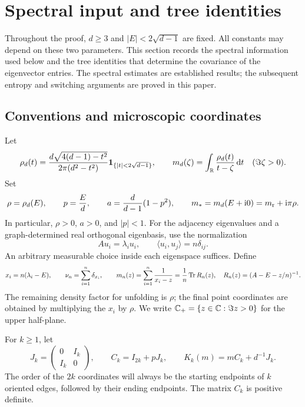 \section{Spectral input and tree identities}\label{sec:preliminaries}

Throughout the proof, \(d\ge3\) and \(|E|<2\sqrt{d-1}\) are fixed.
All constants may depend on these two parameters.
This section records the spectral information used below and the tree
identities that determine the covariance of the eigenvector entries.
The spectral estimates are established results; the subsequent entropy
and switching arguments are proved in this paper.

\subsection{Conventions and microscopic coordinates}

Let
\[
 \rho_d(t)=
 \frac{d\sqrt{4(d-1)-t^2}}{2\pi(d^2-t^2)}
 \mathbf 1_{\{|t|<2\sqrt{d-1}\}},
 \qquad
 m_d(\zeta)=\int_{\mathbb R}\frac{\rho_d(t)}{t-\zeta}\,\mathrm d t
 \quad(\Im\zeta>0).
\]
Set
\[
 \rho=\rho_d(E),\qquad p=\frac Ed,\qquad
 a=\frac{d}{d-1}(1-p^2),\qquad
 m_*=m_d(E+\mathrm i0)=m_{\rm r}+\mathrm i\pi\rho.
\]
In particular, \(\rho>0\), \(a>0\), and \(|p|<1\).
For the adjacency eigenvalues and a graph-determined real orthogonal
eigenbasis, use the normalization
\[
 Au_i=\lambda_i u_i,\qquad
 \langle u_i,u_j\rangle=n\delta_{ij}.
\]
An arbitrary measurable choice inside each eigenspace suffices.
Define
\begin{equation}\label{eq:micro-coordinates}
 x_i=n(\lambda_i-E),\qquad
 \nu_n=\sum_{i=1}^n\delta_{x_i},\qquad
 m_n(z)=\sum_{i=1}^n\frac1{x_i-z}
       =\frac1n\operatorname{Tr} R_n(z),
 \quad
 R_n(z)=(A-E-z/n)^{-1}.
\end{equation}
The remaining density factor for unfolding is \(\rho\); the final
point coordinates are obtained by multiplying the \(x_i\) by \(\rho\).
We write \(\mathbb C_+=\{z\in\mathbb C:\Im z>0\}\) for the upper half-plane.

For \(k\ge1\), let
\begin{equation}\label{eq:channel-matrices}
 J_k=\begin{pmatrix}0&I_k\\ I_k&0\end{pmatrix},
 \qquad C_k=I_{2k}+pJ_k,\qquad
 K_k(m)=mC_k+d^{-1}J_k.
\end{equation}
The order of the \(2k\) coordinates will always be the starting endpoints
of \(k\) oriented edges, followed by their ending endpoints.
The matrix \(C_k\) is positive definite.

